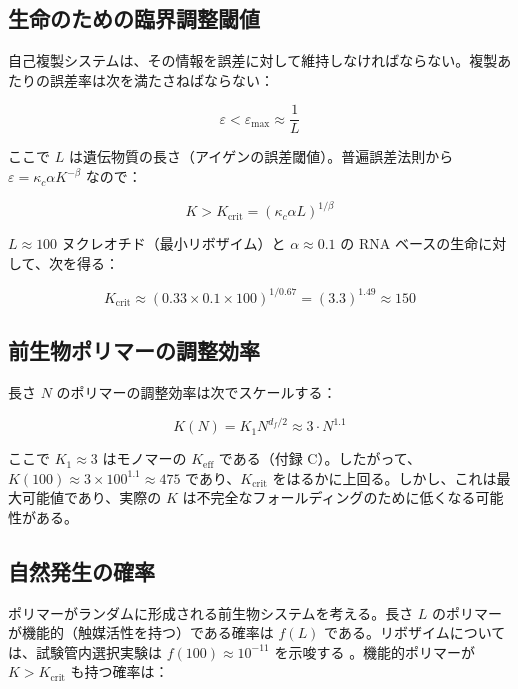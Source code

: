\documentclass[12pt,a4paper]{article}
\newcommand{\Keff}{K_{\mathrm{eff}}}
\newcommand{\kappac}{\kappa_c}
\newcommand{\eps}{\varepsilon}
\newcommand{\df}{d_{\!f}}
\theoremstyle{remark}
\begin{document}
	\subsection{生命のための臨界調整閾値}
	
	自己複製システムは、その情報を誤差に対して維持しなければならない。複製あたりの誤差率は次を満たさねばならない：
	
	\begin{equation}
		\eps < \eps_{\text{max}} \approx \frac{1}{L}
		\label{eq:error-threshold}
	\end{equation}
	
	ここで \(L\) は遺伝物質の長さ（アイゲンの誤差閾値）\cite{Eigen1971}。普遍誤差法則から \(\eps = \kappac \alpha K^{-\beta}\) なので：
	
	\begin{equation}
		K > K_{\text{crit}} = \left( \kappac \alpha L \right)^{1/\beta}
		\label{eq:Kcrit-life}
	\end{equation}
	
	\(L \approx 100\) ヌクレオチド（最小リボザイム）と \(\alpha \approx 0.1\) の RNA ベースの生命に対して、次を得る：
	
	\begin{equation}
		K_{\text{crit}} \approx (0.33 \times 0.1 \times 100)^{1/0.67} = (3.3)^{1.49} \approx 150
		\label{eq:Kcrit-life-num}
	\end{equation}
	
	\subsection{前生物ポリマーの調整効率}
	
	長さ \(N\) のポリマーの調整効率は次でスケールする：
	
	\begin{equation}
		K(N) = K_1 N^{\df/2} \approx 3 \cdot N^{1.1}
		\label{eq:K-polymer}
	\end{equation}
	
	ここで \(K_1 \approx 3\) はモノマーの \(\Keff\) である（付録 C）。したがって、\(K(100) \approx 3 \times 100^{1.1} \approx 475\) であり、\(K_{\text{crit}}\) をはるかに上回る。しかし、これは最大可能値であり、実際の \(K\) は不完全なフォールディングのために低くなる可能性がある。
	
	\subsection{自然発生の確率}
	
	ポリマーがランダムに形成される前生物システムを考える。長さ \(L\) のポリマーが機能的（触媒活性を持つ）である確率は \(f(L)\) である。リボザイムについては、試験管内選択実験は \(f(100) \approx 10^{-11}\) を示唆する \cite{Joyce2002}。機能的ポリマーが \(K > K_{\text{crit}}\) も持つ確率は：
	
\end{document}
